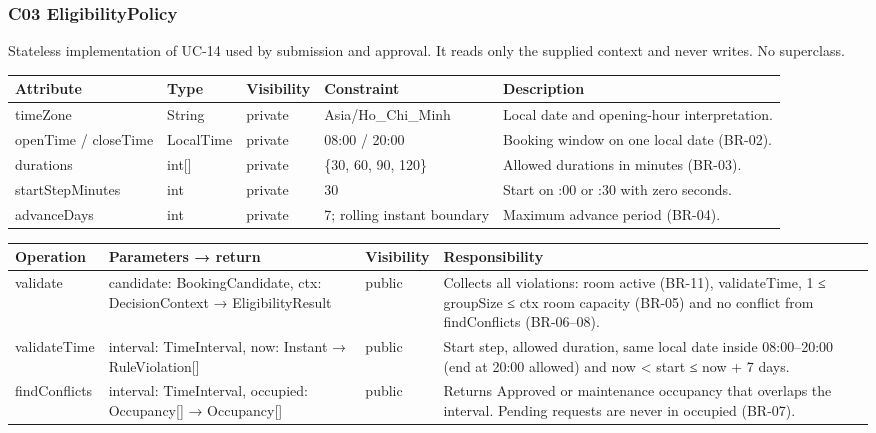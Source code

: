 \subsubsection{C03 EligibilityPolicy}

Stateless implementation of UC-14 used by submission and approval. It reads only the supplied context and never writes. No superclass.\par

\small
\setlength{\tabcolsep}{3pt}
\renewcommand{\arraystretch}{1.12}
\begin{longtable}{|p{}|p{}|p{}|p{}|p{}|}
\hline
\textbf{Attribute} & \textbf{Type} & \textbf{Visibility} & \textbf{Constraint} & \textbf{Description} \\ \hline
\endfirsthead \hline
timeZone & String & private & Asia/Ho\_Chi\_Minh & Local date and opening-hour interpretation. \\ \hline
openTime / closeTime & LocalTime & private & 08:00 / 20:00 & Booking window on one local date (BR-02). \\ \hline
durations & int[] & private & \{30, 60, 90, 120\} & Allowed durations in minutes (BR-03). \\ \hline
startStep\allowbreak Minutes & int & private & 30 & Start on :00 or :30 with zero seconds. \\ \hline
advanceDays & int & private & 7; rolling instant boundary & Maximum advance period (BR-04). \\ \hline
\end{longtable}
\normalsize

\small
\setlength{\tabcolsep}{3pt}
\renewcommand{\arraystretch}{1.12}
\begin{longtable}{|p{}|p{}|p{}|p{}|}
\hline
\textbf{Operation} & \textbf{Parameters → return} & \textbf{Visibility} & \textbf{Responsibility} \\ \hline
\endfirsthead \hline
validate & candidate: BookingCandidate, ctx: DecisionContext → EligibilityResult & public & Collects all violations: room active (BR-11), validateTime, 1 ≤ groupSize ≤ ctx room capacity (BR-05) and no conflict from findConflicts (BR-06–08). \\ \hline
validateTime & interval: TimeInterval, now: Instant → RuleViolation[] & public & Start step, allowed duration, same local date inside 08:00–20:00 (end at 20:00 allowed) and now < start ≤ now + 7 days. \\ \hline
findConflicts & interval: TimeInterval, occupied: Occupancy[] → Occupancy[] & public & Returns Approved or maintenance occupancy that overlaps the interval. Pending requests are never in occupied (BR-07). \\ \hline
\end{longtable}
\normalsize

